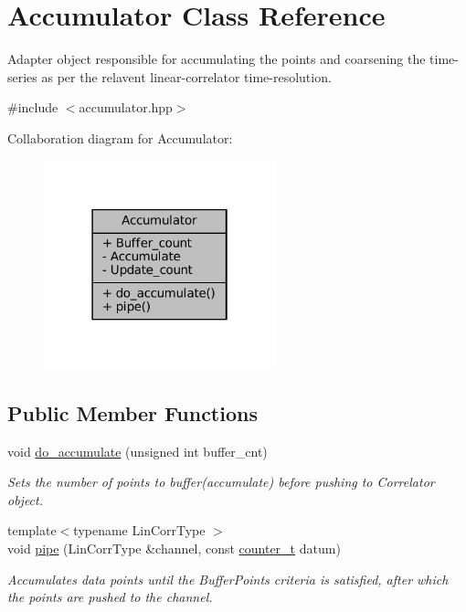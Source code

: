 \hypertarget{classAccumulator}{}\section{Accumulator Class Reference}
\label{classAccumulator}


Adapter object responsible for accumulating the points and coarsening the time-\/series as per the relavent linear-\/correlator time-\/resolution.  




{\ttfamily \#include $<$accumulator.\+hpp$>$}



Collaboration diagram for Accumulator\+:\nopagebreak
\begin{figure}[H]
\begin{center}
\leavevmode
\includegraphics[width=190pt]{d6/d89/classAccumulator__coll__graph}
\end{center}
\end{figure}
\subsection*{Public Member Functions}
\begin{DoxyCompactItemize}
\item 
void \hyperlink{classAccumulator_adab342ee6d376a45ed38fe1e1679a1e2}{do\+\_\+accumulate} (unsigned int buffer\+\_\+cnt)
\begin{DoxyCompactList}\small\item\em Sets the number of points to buffer(accumulate) before pushing to Correlator object. \end{DoxyCompactList}\item 
{\footnotesize template$<$typename Lin\+Corr\+Type $>$ }\\void \hyperlink{classAccumulator_aa7494b569b7f4f2d2ab115e623ab135d}{pipe} (Lin\+Corr\+Type \&channel, const \hyperlink{types_8hpp_a22f279793847eba127de149437848c48}{counter\+\_\+t} datum)
\begin{DoxyCompactList}\small\item\em Accumulates data points until the Buffer\+Points criteria is satisfied, after which the points are pushed to the channel. \end{DoxyCompactList}\end{DoxyCompactItemize}
